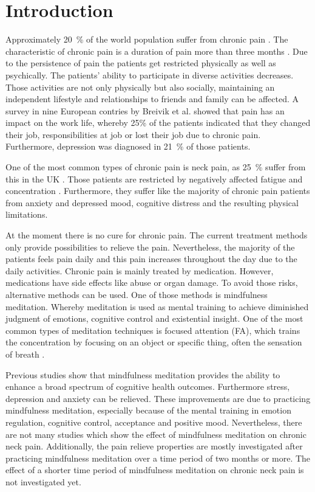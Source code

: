 \section{Introduction}
Approximately 20~\% of the world population suffer from chronic pain \cite{Macfarlanea2016}. The characteristic of chronic pain is a duration of pain more than three months \cite{Mello2016}. Due to the persistence of pain the patients get restricted physically as well as psychically. The patients’ ability to participate in diverse activities decreases. Those activities are not only physically but also socially, maintaining an independent lifestyle and relationships to friends and family can be affected. A survey in nine European contries by Breivik et al. \cite{Breivik2006} showed that pain has an impact on the work life, whereby 25\% of the patients indicated that they changed their job, responsibilities at job or lost their job due to chronic pain. Furthermore, depression was diagnosed in 21~\% of those patients. \cite{Breivik2006} 

One of the most common types of chronic pain is neck pain, as 25~\% suffer from this in the UK \cite{Macfarlanea2016}. Those patients are restricted by negatively affected fatigue and concentration \cite{vanRanderaat2016}. Furthermore, they suffer like the majority of chronic pain patients from anxiety and depressed mood, cognitive distress and the resulting physical limitations. \cite{Gross2013} 

At the moment there is no cure for chronic pain. The current treatment methods only provide possibilities to relieve the pain. \cite{Pope2017,marcus2009} Nevertheless, the majority of the patients feels pain daily and this pain increases throughout the day due to the daily activities. \cite{Breivik2006} Chronic pain is mainly treated by medication. However, medications have side effects like abuse or organ damage. To avoid those risks, alternative methods can be used. One of those methods is mindfulness meditation. Whereby meditation is used as mental training to achieve diminished judgment of emotions, cognitive control and existential insight. \cite{marcus2009} One of the most common types of meditation techniques is focused attention (FA), which trains the concentration by focusing on an object or specific thing, often the sensation of breath \cite{Zeidan2016}. 

Previous studies show that mindfulness meditation provides the ability to enhance a broad spectrum of cognitive health outcomes. Furthermore stress, depression and anxiety can be relieved. These improvements are due to practicing mindfulness meditation, especially because of the mental training in emotion regulation, cognitive control, acceptance and positive mood. \cite{marcus2009,Zeidan2012} Nevertheless, there are not many studies which show the effect of mindfulness meditation on chronic neck pain. \cite{Macfarlanea2016} Additionally, the pain relieve properties are mostly investigated after practicing mindfulness meditation over a time period of two months or more. The effect of a shorter time period of mindfulness meditation on chronic neck pain is not investigated yet. 


